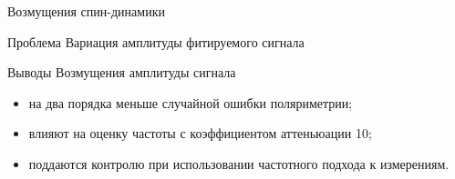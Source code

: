 \documentclass[14pt]{beamer}
\begin{document}
\begin{frame}{Возмущения спин-динамики}
	\begin{block}{Проблема}
		Вариация амплитуды фитируемого сигнала
	\end{block}
	\begin{block}{Выводы}
		Возмущения амплитуды сигнала
		\begin{itemize}
			\item на два порядка меньше случайной ошибки поляриметрии;
			\item влияют на оценку частоты с коэффициентом аттеньюации 10;
			\item поддаются контролю при использовании частотного подхода к измерениям.
		\end{itemize}
	\end{block}
\end{frame}
\end{document}

